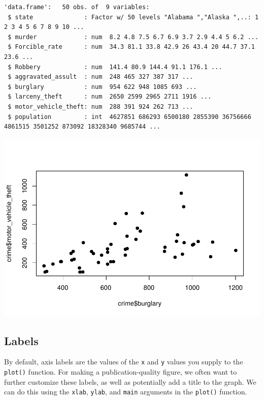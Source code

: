 \documentclass[
]{krantz}
\makeatletter
\newenvironment{Shaded}{\begin{snugshade}}{\end{snugshade}}
\newcommand{\DataTypeTok}[1]{\textcolor[rgb]{0.27,0.27,0.27}{#1}}
\newcommand{\DecValTok}[1]{\textcolor[rgb]{0.06,0.06,0.06}{#1}}
\newcommand{\KeywordTok}[1]{\textcolor[rgb]{0.27,0.27,0.27}{\textbf{#1}}}
\newcommand{\NormalTok}[1]{#1}
\newcommand{\OperatorTok}[1]{\textcolor[rgb]{0.43,0.43,0.43}{\textbf{#1}}}
\newcommand{\StringTok}[1]{\textcolor[rgb]{0.5,0.5,0.5}{#1}}
\newenvironment{kframe}{%
\medskip{}
\setlength{\fboxsep}{.8em}
 \def\at@end@of@kframe{}%
 \ifinner\ifhmode%
  \def\at@end@of@kframe{\end{minipage}}%
  \begin{minipage}{\columnwidth}%
 \fi\fi%
 \def\FrameCommand##1{\hskip\@totalleftmargin \hskip-\fboxsep
 \colorbox{shadecolor}{##1}\hskip-\fboxsep
     \hskip-\linewidth \hskip-\@totalleftmargin \hskip\columnwidth}%
 \MakeFramed {\advance\hsize-\width
   \@totalleftmargin\z@ \linewidth\hsize
   \@setminipage}}%
 {\par\unskip\endMakeFramed%
 \at@end@of@kframe}
\renewenvironment{Shaded}{\begin{kframe}}{\end{kframe}}
\makeatother
\begin{document}
\begin{verbatim}
'data.frame':   50 obs. of  9 variables:
 $ state              : Factor w/ 50 levels "Alabama ","Alaska ",..: 1 2 3 4 5 6 7 8 9 10 ...
 $ murder             : num  8.2 4.8 7.5 6.7 6.9 3.7 2.9 4.4 5 6.2 ...
 $ Forcible_rate      : num  34.3 81.1 33.8 42.9 26 43.4 20 44.7 37.1 23.6 ...
 $ Robbery            : num  141.4 80.9 144.4 91.1 176.1 ...
 $ aggravated_assult  : num  248 465 327 387 317 ...
 $ burglary           : num  954 622 948 1085 693 ...
 $ larceny_theft      : num  2650 2599 2965 2711 1916 ...
 $ motor_vehicle_theft: num  288 391 924 262 713 ...
 $ population         : int  4627851 686293 6500180 2855390 36756666 4861515 3501252 873092 18328340 9685744 ...
\end{verbatim}

\begin{Shaded}
\end{Shaded}

\includegraphics{bookdown_files/figure-latex/unnamed-chunk-343-1.pdf}

\hypertarget{labels-1}{%
\subsection{Labels}\label{labels-1}}

By default, axis labels are the values of the \texttt{x} and \texttt{y} values you supply to the \texttt{plot()} function. For making a publication-quality figure, we often want to further customize these labels, as well as potentially add a title to the graph. We can do this using the \texttt{xlab}, \texttt{ylab}, and \texttt{main} arguments in the \texttt{plot()} function.
\end{document}
